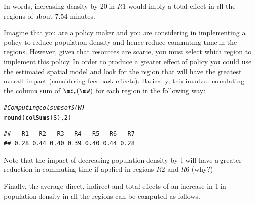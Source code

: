 \documentclass[english,12pt]{book}\usepackage[]{graphicx}\usepackage[]{xcolor}
\makeatletter
\newcommand{\hlnum}[1]{\textcolor[rgb]{0.686,0.059,0.569}{#1}}%
\newcommand{\hlcom}[1]{\textcolor[rgb]{0.678,0.584,0.686}{\textit{#1}}}%
\newcommand{\hlstd}[1]{\textcolor[rgb]{0.345,0.345,0.345}{#1}}%
\newcommand{\hlkwd}[1]{\textcolor[rgb]{0.737,0.353,0.396}{\textbf{#1}}}%
\newenvironment{kframe}{%
 \def\at@end@of@kframe{}%
 \ifinner\ifhmode%
  \def\at@end@of@kframe{\end{minipage}}%
  \begin{minipage}{\columnwidth}%
 \fi\fi%
 \def\FrameCommand##1{\hskip\@totalleftmargin \hskip-\fboxsep
 \colorbox{shadecolor}{##1}\hskip-\fboxsep
     \hskip-\linewidth \hskip-\@totalleftmargin \hskip\columnwidth}%
 \MakeFramed {\advance\hsize-\width
   \@totalleftmargin\z@ \linewidth\hsize
   \@setminipage}}%
 {\par\unskip\endMakeFramed%
 \at@end@of@kframe}
\newenvironment{knitrout}{}{} %
\makeatother
\begin{document}
In words, increasing density by 20 in $R1$ would imply a total effect  in all the regions of about 7.54 minutes.

Imagine that you are a policy maker and you are considering in implementing a policy to reduce population density and hence reduce commuting time in the regions. However, given that resources are scarce, you must select which region to implement this policy. In order to produce a greater effect of policy you could use the estimated spatial model and look for the region that will have the greatest overall impact (considering feedback effects). Basically, this involves calculating the column sum of $\mS_r(\mW)$ for each region in the following way: 

\begin{knitrout}
\color{fgcolor}\begin{kframe}
\begin{alltt}
\hlcom{# Computing colsums of S(W)}
\hlkwd{round}\hlstd{(}\hlkwd{colSums}\hlstd{(S),} \hlnum{2}\hlstd{)}
\end{alltt}
\begin{verbatim}
##   R1   R2   R3   R4   R5   R6   R7 
## 0.28 0.44 0.40 0.39 0.40 0.44 0.28
\end{verbatim}
\end{kframe}
\end{knitrout}
   
Note that the impact of decreasing population density by 1 will have a greater reduction in commuting time if applied in regions $R2$ and $R6$ (why?)

Finally, the average direct, indirect and total effects of an increase in 1 in population density in all the regions can be computed as follows. 
\end{document}
